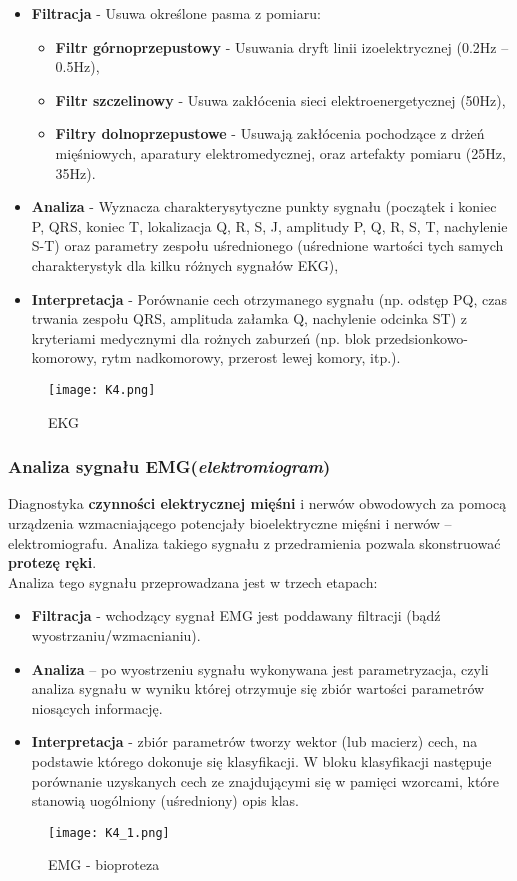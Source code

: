 \begin{itemize}
	\item \textbf{Filtracja} - Usuwa określone pasma z pomiaru:
	\begin{itemize}
		\item \textbf{Filtr górnoprzepustowy} - Usuwania dryft linii izoelektrycznej (0.2Hz – 0.5Hz),
		\item \textbf{Filtr szczelinowy} - Usuwa zakłócenia sieci elektroenergetycznej (50Hz),
		\item \textbf{Filtry dolnoprzepustowe} - Usuwają zakłócenia pochodzące z drżeń mięśniowych, aparatury elektromedycznej, oraz artefakty pomiaru (25Hz, 35Hz).
	\end{itemize}
	\item \textbf{Analiza} - Wyznacza charakterysytyczne punkty sygnału (początek i koniec P, QRS, koniec T, lokalizacja Q, R, S, J, amplitudy P, Q, R, S, T, nachylenie S-T) oraz parametry zespołu uśrednionego (uśrednione wartości tych samych charakterystyk dla kilku różnych sygnałów EKG),
	\item \textbf{Interpretacja} - Porównanie cech otrzymanego sygnału (np. odstęp PQ, czas trwania zespołu QRS, amplituda załamka Q, nachylenie odcinka ST) z kryteriami medycznymi dla rożnych zaburzeń (np. blok przedsionkowo-komorowy, rytm nadkomorowy, przerost lewej komory, itp.).
\end{itemize}

\begin{figure}[H]
	\centering
	\texttt{[image: K4.png]}
	\caption{EKG}
\end{figure}

\subsubsection{Analiza sygnału EMG(\textit{elektromiogram})}

Diagnostyka \textbf{czynności elektrycznej mięśni} i nerwów obwodowych za pomocą urządzenia wzmacniającego potencjały bioelektryczne mięśni i nerwów – elektromiografu.
Analiza takiego sygnału z przedramienia pozwala skonstruować \textbf{protezę ręki}. \\

Analiza tego sygnału przeprowadzana jest w trzech etapach:

\begin{itemize}
	\item \textbf{Filtracja} - wchodzący sygnał EMG jest poddawany filtracji (bądź wyostrzaniu/wzmacnianiu).
	\item \textbf{Analiza} – po wyostrzeniu sygnału wykonywana jest parametryzacja, czyli analiza sygnału w wyniku której otrzymuje się zbiór wartości parametrów niosących informację.
	\item \textbf{Interpretacja} - zbiór parametrów tworzy wektor (lub macierz) cech, na podstawie którego dokonuje się klasyfikacji. W bloku klasyfikacji następuje porównanie uzyskanych cech ze znajdującymi się w pamięci wzorcami, które stanowią uogólniony (uśredniony) opis klas.
\end{itemize}

\begin{figure}[H]
	\centering
	\texttt{[image: K4\_1.png]}
	\caption{EMG - bioproteza}
\end{figure}
